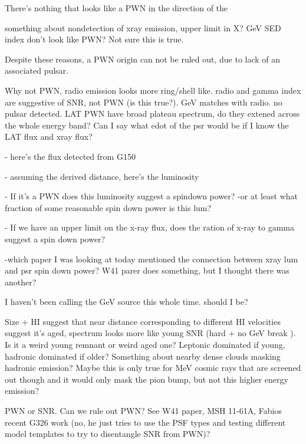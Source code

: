 There's nothing that looks like a PWN in the direction of the \psrLike{}

something about nondetection of xray emission, upper limit in X? GeV SED index don't look like PWN? Not sure this is true.

Despite these reasons, a PWN origin can not be ruled out, due to lack of an associated pulsar.



Why not PWN, radio emission looks more ring/shell like. radio and gamma index are suggestive of SNR, not PWN (is this true?). GeV matches with radio. no pulsar detected. LAT PWN have broad plateau spectrum, do they extened across the whole energy band? Can I say what edot of the psr would be if I know the LAT flux and xray flux? 

- here's the flux detected from G150

- assuming the derived distance, here's the luminosity

- If it's a PWN does this luminosity suggest a spindown power?
-or at least what fraction of some reasonable spin down power is this lum?

- If we have an upper limit on the x-ray flux, does the ration of x-ray to gamma suggest a spin down power?

-which paper I was looking at today mentioned the connection between xray lum and psr spin down power? W41 parer does something, but I thought there was another?

I haven't been calling the GeV source \Gone{} this whole time. should I be?

Size + HI suggest that near distance corresponding to different HI velocities suggest it's aged, spectrum looks more like young SNR (hard + no GeV break ). Is it a weird young remnant or weird aged one? Leptonic dominated if young, hadronic dominated if older? Something about nearby dense clouds masking hadronic emission? Maybe this is only true for MeV cosmic rays that are screened out though and it would only mask the pion bump, but not this higher energy emission?

PWN or SNR. Can we rule out PWN? See W41 paper, MSH 11-61A, Fabios recent G326 work (no, he just tries to use the PSF types and testing different model templates to try to disentangle SNR from PWN)?


